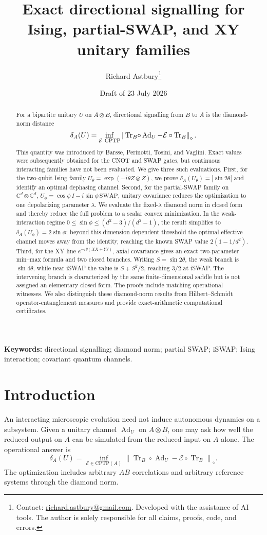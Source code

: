 \documentclass[11pt,a4paper]{article}
\title{\bfseries Exact directional signalling for Ising,
partial-SWAP, and XY unitary families}
\author{Richard Astbury\thanks{Contact:
\href{mailto:richard.astbury@gmail.com}{richard.astbury@gmail.com}.
Developed with the assistance of AI tools. The author is solely responsible
for all claims, proofs, code, and errors.}}
\date{Draft of 23 July 2026}
\theoremstyle{remark}
\newcommand{\Tr}{\operatorname{Tr}}
\newcommand{\Ad}{\operatorname{Ad}}
\newcommand{\cE}{\mathcal{E}}
\newcommand{\diamondnorm}[1]{\left\lVert #1\right\rVert_{\diamond}}
\newcommand{\SWAP}{\mathrm{SWAP}}
\begin{document}
\maketitle

\begin{abstract}
For a bipartite unitary $U$ on $A\otimes B$, directional signalling from
$B$ to $A$ is the diamond-norm distance
\[
 \delta_A(U)=\inf_{\cE\ {\rm CPTP}}
 \diamondnorm{\Tr_B\!\circ\Ad_U-\cE\circ\Tr_B}.
\]
This quantity was introduced by Barsse, Perinotti, Tosini, and Vaglini.
Exact values were subsequently obtained for the CNOT and SWAP gates, but
continuous interacting families have not been evaluated.  We give three such
evaluations.  First, for the two-qubit Ising family
$U_\theta=\exp(-i\theta Z\otimes Z)$, we prove
$\delta_A(U_\theta)=|\sin 2\theta|$ and identify an optimal dephasing channel.
Second, for the partial-SWAP family on $\mathbb{C}^d\otimes\mathbb{C}^d$,
$U_\phi=\cos\phi\,I-i\sin\phi\,\SWAP$, unitary covariance reduces the
optimization to one depolarizing parameter $\lambda$.  We evaluate the
fixed-$\lambda$ diamond norm in closed form and thereby reduce the full
problem to a scalar convex minimization.  In the weak-interaction regime
$0\leq\sin\phi\leq(d^2-3)/(d^2-1)$, the result simplifies to
$\delta_A(U_\phi)=2\sin\phi$; beyond this dimension-dependent threshold the
optimal effective channel moves away from the identity, reaching the known
SWAP value $2(1-1/d^2)$.
Third, for the XY line $e^{-i\theta(XX+YY)}$, axial covariance gives an exact
two-parameter min--max formula and two closed branches.  Writing
$S=\sin2\theta$, the weak branch is $\sin4\theta$, while near iSWAP the value is
$S+S^2/2$, reaching $3/2$ at iSWAP.  The intervening branch is characterized
by the same finite-dimensional saddle but is not assigned an elementary
closed form.
The proofs include matching operational witnesses.  We also distinguish
these diamond-norm results from Hilbert--Schmidt operator-entanglement
measures and provide exact-arithmetic computational certificates.
\end{abstract}

\noindent\textbf{Keywords:} directional signalling; diamond norm;
partial SWAP; iSWAP; Ising interaction; covariant quantum channels.

\section{Introduction}

An interacting microscopic evolution need not induce autonomous dynamics on
a subsystem.  Given a unitary channel $\Ad_U$ on $A\otimes B$, one may ask how
well the reduced output on $A$ can be simulated from the reduced input on $A$
alone.  The operational answer is
\begin{equation}
 \delta_A(U)
 =\inf_{\cE\in\mathrm{CPTP}(A)}
   \diamondnorm{\Tr_B\circ\Ad_U-\cE\circ\Tr_B}.
 \label{eq:defect}
\end{equation}
The optimization includes arbitrary $AB$ correlations and arbitrary reference
systems through the diamond norm.
\end{document}
